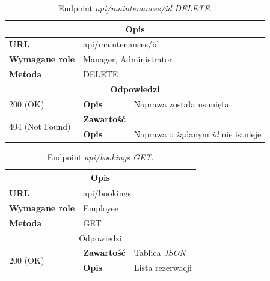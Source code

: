 \documentclass[eng,printmode,openany]{mgr}
\begin{document}
\begin{table}[H]
	\caption{Endpoint \textit{api/maintenances/id DELETE}.}
	\begin{tabularx}{\textwidth}{|l|l|X|}
		\hline
		\multicolumn{3}{|c|}{\textbf{\textbf{Opis}}}
		\\ \hline
		\textbf{URL}                       & \multicolumn{2}{l|}{api/maintenances/id}
		\\ \hline
		\textbf{Wymagane role}             & \multicolumn{2}{l|}{Manager, Administrator}
		\\ \hline
		\textbf{Metoda}                    & \multicolumn{2}{l|}{DELETE}
		\\ \hline
		\multicolumn{3}{|c|}{\textbf{Odpowiedzi}}
		\\ \hline
		200 (OK)			                & \textbf{Opis}         	& Naprawa została usunięta
		\\ \hline
		\multirow{2}{*}{404 (Not Found)} 	& \textbf{Zawartość}     & 
		\\ \cline{2-3}                      & \textbf{Opis}          & Naprawa o żądanym \textit{id} nie istnieje
		\\ \hline
	\end{tabularx}
\end{table}

\begin{table}[H]
	\caption{Endpoint \textit{api/bookings GET}.}
	\begin{tabularx}{\textwidth}{|l|l|X|}
		\hline
		\multicolumn{3}{|c|}{\textbf{\textbf{Opis}}}
		\\ \hline
		\textbf{URL}                         & \multicolumn{2}{l|}{api/bookings}
		\\ \hline
		\textbf{Wymagane role}               & \multicolumn{2}{l|}{Employee}
		\\ \hline
		\textbf{Metoda}                      & \multicolumn{2}{l|}{GET}
		\\ \hline
		\multicolumn{3}{|c|}{ Odpowiedzi}
		\\ \hline
		\multirow{2}{*}{200 (OK)}   & \textbf{Zawartość}         & Tablica \textit{JSON}
		\\ \cline{2-3}              & \textbf{Opis}         	    & Lista rezerwacji
		\\ \hline
	\end{tabularx}
\end{table}
\end{document}
